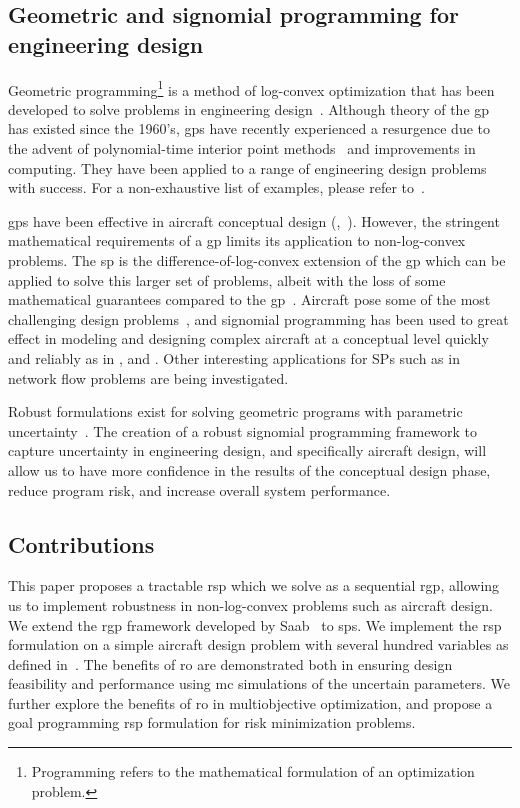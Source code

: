 \subsection{Geometric and signomial programming for engineering design}

Geometric programming\footnote{Programming refers to the mathematical formulation of an optimization problem.}
is a method of log-convex optimization that has been developed
to solve problems in engineering design~\cite{Duffin1967}. Although theory of the \gls{gp} has existed since
the 1960's, \gls{gp}s have recently experienced a resurgence due to the advent of polynomial-time
interior point methods~\cite{Nesterov1994} and improvements in computing. They have been
applied to a range of engineering design problems with success. For a non-exhaustive list of examples,
please refer to~\cite{Boyd2007}.

\gls{gp}s have been effective in aircraft conceptual design
(\cite{Hoburg2013},~\cite{Burton2017}).
However, the stringent mathematical requirements of a \gls{gp} limits its application to non-log-convex problems.
The \gls{sp} is the difference-of-log-convex extension of the \gls{gp} which can be applied to
solve this larger set of problems, albeit with the loss of some mathematical guarantees compared to the \gls{gp}~\cite{Kirschen2018}.
Aircraft pose some of the most challenging design problems~\cite{York2018}, and signomial programming
has been used to great effect in modeling and designing complex aircraft at a conceptual level quickly
and reliably as in \cite{York2018}, \cite{Kirschen2018} and \cite{Kirschen2016}.
Other interesting applications for SPs such as in network flow problems are being investigated.

Robust formulations exist for solving geometric programs with parametric uncertainty~\cite{Saab2018}.
The creation of a robust signomial programming framework to capture uncertainty in engineering
design, and specifically aircraft design, will allow us to have more confidence in the results
of the conceptual design phase, reduce program risk, and increase overall system performance.

\subsection{Contributions}

This paper proposes a tractable \gls{rsp} which we solve as a sequential \gls{rgp},
allowing us to implement robustness in non-log-convex problems such as aircraft design.
We extend the \gls{rgp} framework developed by Saab~\cite{Saab2018} to \gls{sp}s.
We implement the \gls{rsp} formulation on a simple aircraft design problem with several hundred
variables as defined in~\cite{Ozturk2018}.
The benefits of \gls{ro} are demonstrated both in ensuring design feasibility and performance
using \gls{mc} simulations of the uncertain parameters.
We further explore the benefits of \gls{ro} in multiobjective optimization, and propose
a goal programming \gls{rsp} formulation for risk minimization problems.


